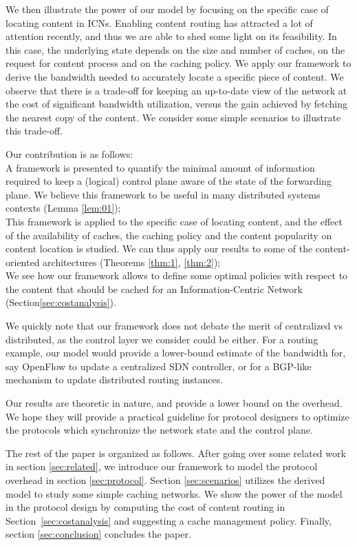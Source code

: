 \documentclass[conference]{IEEEtran}
\theoremstyle{plain}
\theoremstyle{remark}
\begin{document}
We then illustrate the power of our model by focusing on the specific case of locating content in ICNs. Enabling content routing has attracted a lot of attention recently, and thus we are able to shed some light on its feasibility.  In this case, the underlying state depends on the size and number of caches, on the request for content process and on the caching policy. We  apply our framework to derive the bandwidth needed to accurately locate a specific piece of content. We observe that there is a  trade-off for keeping an up-to-date view of the network at the cost of  significant  bandwidth utilization, versus the gain achieved by fetching the nearest copy of the content. We consider some simple scenarios to illustrate this trade-off.

Our contribution is as follows:\\
 A framework is presented to quantify the minimal amount of information required to keep a (logical) control plane aware of the state of the forwarding plane. We believe this framework to be useful in many distributed systems contexts (Lemma \ref{lem:01});\\
 This framework is applied to the specific case of locating content, and the effect of the availability of caches, the caching policy and the content popularity on content location is studied. We can thus apply our results to some of the content-oriented architectures (Theorems \ref{thm:1}, \ref{thm:2});\\
 We see how our framework allows to define some optimal policies with respect to the content that should be cached for an Information-Centric Network (Section\ref{sec:costanalysis}).

We quickly note that our framework does not debate the merit of centralized vs distributed, as the control layer we consider could be either. For a routing example, our model would provide a lower-bound estimate of the bandwidth for, say OpenFlow to update a centralized SDN controller, or for a BGP-like mechanism to update distributed routing instances.

Our results are theoretic in nature, and provide a lower bound on the overhead. We hope they will provide a practical guideline for protocol designers to optimize the protocols which synchronize the network state and the control plane.

The rest of the paper is organized as follows. After going over some related work in section \ref{sec:related}, we  introduce our framework to model the protocol overhead in section \ref{sec:protocol}. Section \ref{sec:scenarios} utilizes the derived model to study some simple caching networks. We show the power of the model in the protocol design by computing the cost of content routing in Section~\ref{sec:costanalysis} and suggesting a cache management policy. Finally, section \ref{sec:conclusion} concludes the paper.
\end{document}
